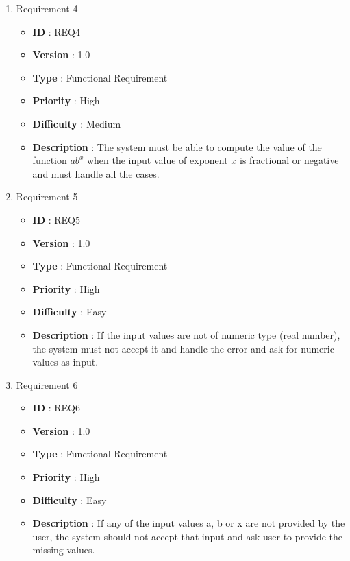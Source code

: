 \documentclass[12pt, a4paper]{article}
\begin{document}
\begin{enumerate}
    
     \item{} Requirement 4
        \begin{itemize}
        \item \textbf{ID} : REQ4
        \item \textbf{Version} : 1.0
        \item \textbf{Type} : Functional Requirement
        \item \textbf{Priority} : High
        \item \textbf{Difficulty} : Medium
        \item \textbf{Description} : The system must be able to compute the value of the function $ab^x$ when the input value of exponent $x$ is fractional or negative and must handle all the cases.
        \end{itemize}
        
       \item{} Requirement 5
        \begin{itemize}
        \item \textbf{ID} : REQ5
        \item \textbf{Version} : 1.0
        \item \textbf{Type} : Functional Requirement
        \item \textbf{Priority} : High
        \item \textbf{Difficulty} : Easy
        \item \textbf{Description} : If the input values are not of numeric type (real number), the system must not accept it and handle the error and ask for numeric values as input.
        \end{itemize}
    
    \item{} Requirement 6
        \begin{itemize}
        \item \textbf{ID} : REQ6
        \item \textbf{Version} : 1.0
        \item \textbf{Type} : Functional Requirement
        \item \textbf{Priority} : High
        \item \textbf{Difficulty} : Easy
        \item \textbf{Description} : If any of the input values a, b or x are not provided by the user, the system should not accept that input and ask user to provide the missing values. 
        \end{itemize}
    

\end{enumerate}
\end{document}
